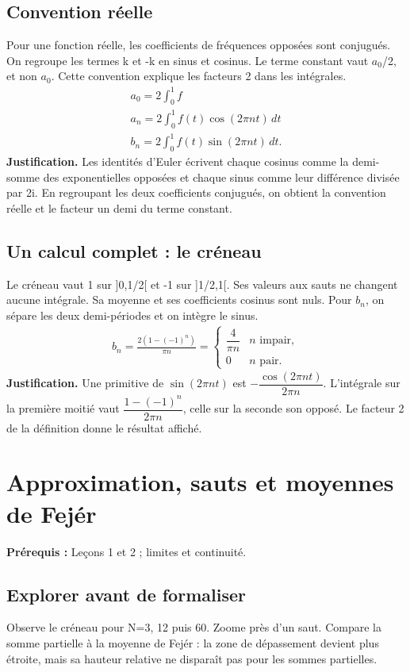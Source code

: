 \documentclass[11pt,a4paper]{article}
\begin{document}
\subsection{Convention réelle}
Pour une fonction réelle, les coefficients de fréquences opposées sont conjugués. On regroupe les termes k et -k en sinus et cosinus. Le terme constant vaut $a_0$/2, et non $a_0$. Cette convention explique les facteurs 2 dans les intégrales.
\[\begin{gathered}a_0=2\int_0^1 f\\ a_n=2\int_0^1 f(t)\cos(2\pi nt)\,dt\\ b_n=2\int_0^1 f(t)\sin(2\pi nt)\,dt.\end{gathered}\]
\textbf{Justification.} Les identités d’Euler écrivent chaque cosinus comme la demi-somme des exponentielles opposées et chaque sinus comme leur différence divisée par 2i. En regroupant les deux coefficients conjugués, on obtient la convention réelle et le facteur un demi du terme constant.
\subsection{Un calcul complet : le créneau}
Le créneau vaut 1 sur ]0,1/2[ et -1 sur ]1/2,1[. Ses valeurs aux sauts ne changent aucune intégrale. Sa moyenne et ses coefficients cosinus sont nuls. Pour $b_n$, on sépare les deux demi-périodes et on intègre le sinus.
\[\begin{gathered}b_n=\frac{2(1-(-1)^n)}{\pi n}=\begin{cases}\dfrac{4}{\pi n}&n\text{ impair},\\0&n\text{ pair}.\end{cases}\end{gathered}\]
\textbf{Justification.} Une primitive de $\sin(2\pi nt)$ est $-\dfrac{\cos(2\pi nt)}{2\pi n}$. L’intégrale sur la première moitié vaut $\dfrac{1-(-1)^n}{2\pi n}$, celle sur la seconde son opposé. Le facteur 2 de la définition donne le résultat affiché.
\clearpage
\section{Approximation, sauts et moyennes de Fejér}
\textbf{Prérequis :} Leçons 1 et 2 ; limites et continuité.
\subsection*{Explorer avant de formaliser}Observe le créneau pour N=3, 12 puis 60. Zoome près d’un saut. Compare la somme partielle à la moyenne de Fejér : la zone de dépassement devient plus étroite, mais sa hauteur relative ne disparaît pas pour les sommes partielles.
\end{document}
